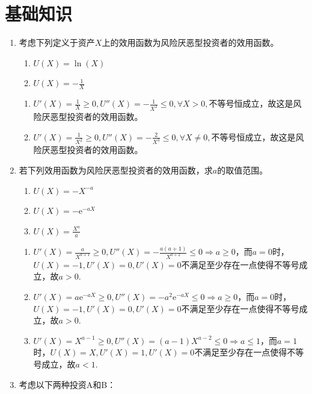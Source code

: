 \section{基础知识}
\begin{enumerate}
    \item 考虑下列定义于资产$X$上的效用函数为风险厌恶型投资者的效用函数。
    \begin{enumerate}[label=(\arabic*)]
        \item $U(X)=\ln(X)$
        \item $\displaystyle U(X)=-\frac{1}{X}$
    \end{enumerate}
    \pro
    \begin{enumerate}[label=(\arabic*)]
        \item $\displaystyle U'(X)=\frac{1}{X} \geqslant 0, U''(X)=-\frac{1}{X^2} \leqslant 0, \forall X>0,$不等号恒成立，故这是风险厌恶型投资者的效用函数。
        \item $\displaystyle U'(X)=\frac{1}{X^2} \geqslant 0, U''(X)=-\frac{2}{X^3} \leqslant 0, \forall X \neq 0,$不等号恒成立，故这是风险厌恶型投资者的效用函数。
    \end{enumerate}
    \item 若下列效用函数为风险厌恶型投资者的效用函数，求$a$的取值范围。
    \begin{enumerate}[label=(\arabic*)]
        \item $U(X)=-X^{-a}$
        \item $U(X)=-\mathrm{e}^{-aX}$
        \item $\displaystyle U(X)=\frac{X^a}{a}$
    \end{enumerate}
    \sol
    \begin{enumerate}[label=(\arabic*)]
        \item $\displaystyle U'(X)=\frac{a}{X^{a+1}} \geqslant 0, U''(X)=-\frac{a(a+1)}{X^{a+2}} \leqslant 0 \Rightarrow a \geqslant 0$，而$a=0$时，$U(X)=-1,U'(X)=0,U'(X)=0$不满足至少存在一点使得不等号成立，故$a > 0$.
        \item $\displaystyle U'(X)=a\mathrm{e}^{-aX} \geqslant 0, U''(X)=-a^2\mathrm{e}^{-aX} \leqslant 0 \Rightarrow a \geqslant 0$，而$a=0$时，$U(X)=-1,U'(X)=0,U'(X)=0$不满足至少存在一点使得不等号成立，故$a > 0$.
        \item $\displaystyle U'(X)=X^{a-1} \geqslant 0, U''(X)=(a-1)X^{a-2} \leqslant 0 \Rightarrow a \leqslant 1$，而$a=1$时，$U(X)=X,U'(X)=1,U'(X)=0$不满足至少存在一点使得不等号成立，故$a < 1$.
    \end{enumerate}
    \item 考虑以下两种投资A和B：

\end{enumerate}
